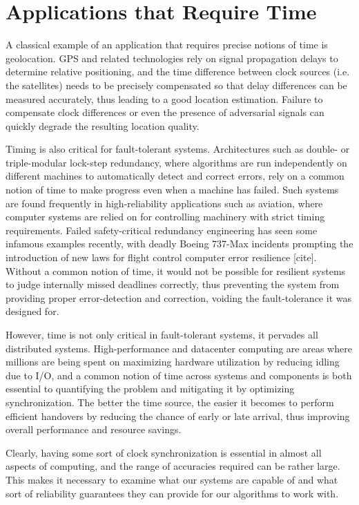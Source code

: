 
\section{Applications that Require Time}
A classical example of an application that requires precise notions of time is geolocation. GPS and related technologies rely on signal propagation delays to determine relative positioning, and the time difference between clock sources (i.e. the satellites) needs to be precisely compensated so that delay differences can be measured accurately, thus leading to a good location estimation. Failure to compensate clock differences or even the presence of adversarial signals can quickly degrade the resulting location quality.

Timing is also critical for fault-tolerant systems. Architectures such as double- or triple-modular lock-step redundancy, where algorithms are run independently on different machines to automatically detect and correct errors, rely on a common notion of time to make progress even when a machine has failed. Such systems are found frequently in high-reliability applications such as aviation, where computer systems are relied on for controlling machinery with strict timing requirements. Failed safety-critical redundancy engineering has seen some infamous examples recently, with deadly Boeing 737-Max incidents prompting the introduction of new laws for flight control computer error resilience [cite]. Without a common notion of time, it would not be possible for resilient systems to judge internally missed deadlines correctly, thus preventing the system from providing proper error-detection and correction, voiding the fault-tolerance it was designed for.

However, time is not only critical in fault-tolerant systems, it pervades all distributed systems. High-performance and datacenter computing are areas where millions are being spent on maximizing hardware utilization by reducing idling due to I/O, and a common notion of time across systems and components is both essential to quantifying the problem and mitigating it by optimizing synchronization. The better the time source, the easier it becomes to perform efficient handovers by reducing the chance of early or late arrival, thus improving overall performance and resource savings.

Clearly, having some sort of clock synchronization is essential in almost all aspects of computing, and the range of accuracies required can be rather large. This makes it necessary to examine what our systems are capable of and what sort of reliability guarantees they can provide for our algorithms to work with.
